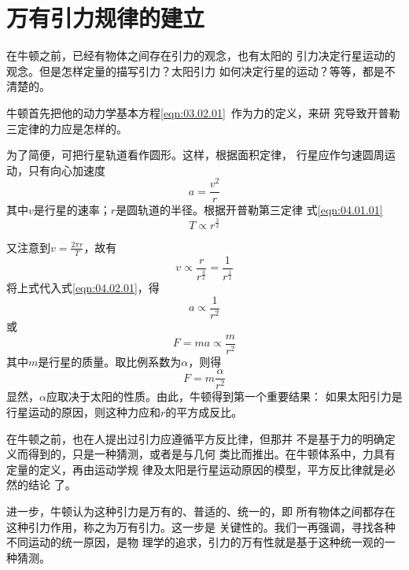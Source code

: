 \section{万有引力规律的建立}\label{sec:04.02}

在牛顿之前，已经有物体之间存在引力的观念，也有太阳的
引力决定行星运动的观念。但是怎样定量的描写引力？太阳引力
如何决定行星的运动？等等，都是不清楚的。

牛顿首先把他的动力学基本方程\eqref{eqn:03.02.01}~作为力的定义，来研
究导致开普勒三定律的力应是怎样的。

为了简便，可把行星轨道看作圆形。这样，根据面积定律，
行星应作匀速圆周运动，只有向心加速度
\begin{equation}\label{eqn:04.02.01}
	a = \frac { v ^ { 2 } } { r }  
\end{equation}
其中$ v $是行星的速率；$ r $是圆轨道的半径。根据开普勒第三定律
\lhbrak 式\eqref{eqn:04.01.01}\rhbrak 
\begin{equation*}
	T \propto r ^ { \frac { 3 } { 2 } }  
\end{equation*}

又注意到$ v = \frac { 2 \pi r } { T }   $，故有
\begin{equation}\label{eqn:04.02.02}
	v \propto \frac { r } { r ^ \frac { 3 } {2}} = \frac { 1 } { r ^ {  \frac { 1 } { 2 } } }  
\end{equation}
将上式代入式\eqref{eqn:04.02.01}，得
\begin{equation}\label{eqn:04.02.03}
	a \propto \frac { 1 } { r ^ { 2 } }  
\end{equation}
或
\begin{equation*}
	F = m a \propto \frac { m } { r ^ { 2 } }  
\end{equation*}
其中$ m $是行星的质量。取比例系数为$ \alpha $，则得
\begin{equation}\label{eqn:04.02.04}
	F = m \frac { \alpha } { r ^ { 2 } } 
\end{equation}
显然，$ \alpha $应取决于太阳的性质。由此，牛顿得到第一个重要结果：
如果太阳引力是行星运动的原因，则这种力应和$ r $的平方成反比。

在牛顿之前，也在人提出过引力应遵循平方反比律，但那并
不是基于力的明确定义而得到的，只是一种猜测，或者是与几何
类比而推出。在牛顿体系中，力具有定量的定义，再由运动学规
律及太阳是行星运动原因的模型，平方反比律就是必然的结论
了。

进一步，牛顿认为这种引力是万有的、普适的、统一的，即
所有物体之间都存在这种引力作用，称之为万有引力。这一步是
关键性的。我们一再强调，寻找各种不同运动的统一原因，是物
理学的追求，引力的万有性就是基于这种统一观的一种猜测。

